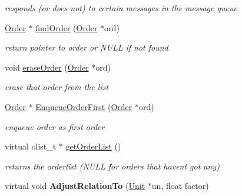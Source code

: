 \begin{DoxyCompactItemize}
\begin{DoxyCompactList}\small\item\em responds (or does not) to certain messages in the message queue \end{DoxyCompactList}\item 
\hyperlink{classOrder}{Order} $\ast$ \hyperlink{classOrder_a09265ddf450a9c0213fd9ac3013ebe8d}{find\+Order} (\hyperlink{classOrder}{Order} $\ast$ord)\hypertarget{classOrder_a09265ddf450a9c0213fd9ac3013ebe8d}{}\label{classOrder_a09265ddf450a9c0213fd9ac3013ebe8d}

\begin{DoxyCompactList}\small\item\em return pointer to order or N\+U\+LL if not found \end{DoxyCompactList}\item 
void \hyperlink{classOrder_a8ec639f0190e686e94191fe5657bb979}{erase\+Order} (\hyperlink{classOrder}{Order} $\ast$ord)\hypertarget{classOrder_a8ec639f0190e686e94191fe5657bb979}{}\label{classOrder_a8ec639f0190e686e94191fe5657bb979}

\begin{DoxyCompactList}\small\item\em erase that order from the list \end{DoxyCompactList}\item 
\hyperlink{classOrder}{Order} $\ast$ \hyperlink{classOrder_a339faab4bd479c78418228436f4107b5}{Enqueue\+Order\+First} (\hyperlink{classOrder}{Order} $\ast$ord)\hypertarget{classOrder_a339faab4bd479c78418228436f4107b5}{}\label{classOrder_a339faab4bd479c78418228436f4107b5}

\begin{DoxyCompactList}\small\item\em enqueue order as first order \end{DoxyCompactList}\item 
virtual olist\+\_\+t $\ast$ \hyperlink{classOrder_aa1f91340af1329d81161bf66e1fb62fe}{get\+Order\+List} ()\hypertarget{classOrder_aa1f91340af1329d81161bf66e1fb62fe}{}\label{classOrder_aa1f91340af1329d81161bf66e1fb62fe}

\begin{DoxyCompactList}\small\item\em returns the orderlist (N\+U\+LL for orders that haven\textquotesingle{}t got any) \end{DoxyCompactList}\item 
virtual void {\bfseries Adjust\+Relation\+To} (\hyperlink{classUnit}{Unit} $\ast$un, float factor)\hypertarget{classOrder_a6d80f534d3fdf1c04d0d5f7a3e543d7c}{}\label{classOrder_a6d80f534d3fdf1c04d0d5f7a3e543d7c}


\end{DoxyCompactItemize}
